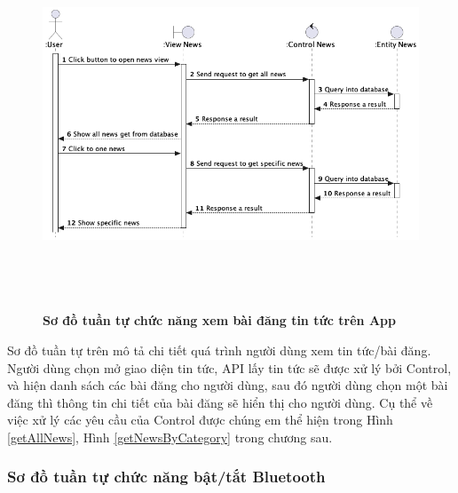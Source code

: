   \begin{figure}[H]
        \centering
        \includegraphics[width=16cm,height=11cm]{Images/mobile_app/view_news.png}
        \caption[ Sơ đồ tuần tự chức năng xem bài đăng tin tứctrên App]{\bfseries \fontsize{12pt}{0pt}
        \selectfont Sơ đồ tuần tự chức năng xem bài đăng tin tức trên App}
        \label{view_news} %
  \end{figure}

  Sơ đồ tuần tự trên mô tả chi tiết quá trình người dùng xem tin tức/bài đăng. Người dùng chọn mở giao diện tin tức, API lấy tin tức sẽ
  được xử lý bởi Control, và hiện danh sách các bài đăng cho người dùng, sau đó người dùng chọn một bài đăng thì thông tin chi tiết
  của bài đăng sẽ hiển thị cho người dùng. Cụ thể về việc xử lý các yêu cầu của Control được chúng em thể hiện trong 
  Hình \ref{getAllNews}, Hình \ref{getNewsByCategory} trong chương sau.

\subsubsection{Sơ đồ tuần tự chức năng bật/tắt Bluetooth}

